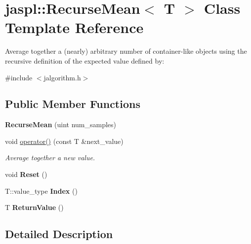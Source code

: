 \hypertarget{classjaspl_1_1_recurse_mean}{}\section{jaspl\+:\+:Recurse\+Mean$<$ T $>$ Class Template Reference}
\label{classjaspl_1_1_recurse_mean}


Average together a (nearly) arbitrary number of container-\/like objects using the recursive definition of the expected value defined by\+:  




{\ttfamily \#include $<$jalgorithm.\+h$>$}

\subsection*{Public Member Functions}
\begin{DoxyCompactItemize}
\item 
{\bfseries Recurse\+Mean} (uint num\+\_\+samples)\hypertarget{classjaspl_1_1_recurse_mean_abbcaa2624b48de1a68407cc44ca9068d}{}\label{classjaspl_1_1_recurse_mean_abbcaa2624b48de1a68407cc44ca9068d}

\item 
void \hyperlink{classjaspl_1_1_recurse_mean_a5c65990ad47245fcf866ad811cd340c3}{operator()} (const T \&next\+\_\+value)
\begin{DoxyCompactList}\small\item\em Average together a new value. \end{DoxyCompactList}\item 
void {\bfseries Reset} ()\hypertarget{classjaspl_1_1_recurse_mean_ac661dff7908c06fe1701feb7d0d07af5}{}\label{classjaspl_1_1_recurse_mean_ac661dff7908c06fe1701feb7d0d07af5}

\item 
T\+::value\+\_\+type {\bfseries Index} ()\hypertarget{classjaspl_1_1_recurse_mean_a7e711fde74234311e529eb671d9be9e1}{}\label{classjaspl_1_1_recurse_mean_a7e711fde74234311e529eb671d9be9e1}

\item 
T {\bfseries Return\+Value} ()\hypertarget{classjaspl_1_1_recurse_mean_ad9ec10f40cbfdc5f9799be43e0855572}{}\label{classjaspl_1_1_recurse_mean_ad9ec10f40cbfdc5f9799be43e0855572}

\end{DoxyCompactItemize}


\subsection{Detailed Description}

